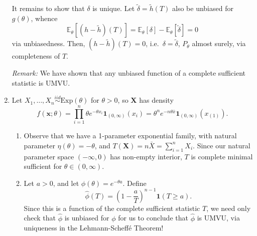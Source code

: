 \documentclass[11pt]{article}
\begin{document}
\begin{enumerate}
    It remains to show that $\delta$ is unique.
    Let $\tilde{\delta} = \tilde{h}(T)$ also be unbiased for $g(\theta)$,
    whence \[
        \mathbb{E}_\theta\left[(h - \tilde{h})(T)\right]
            = \mathbb{E}_\theta[\delta] - \mathbb{E}_\theta[\tilde{\delta}]
            = 0
    \] via unbiasedness.
    Then, $(h - \tilde{h})(T) = 0$, i.e.\ $\delta = \tilde{\delta}$,
    $P_\theta$ almost surely, via completeness of $T$.

    \emph{Remark:} We have shown that any unbiased function of a complete
    sufficient statistic is UMVU.



    \item Let $X_1, \dots, X_n \overset{iid}{\sim} \text{Exp}(\theta)$ for
    $\theta > 0$, so $\bm{X}$ has density \[
        f(\bm{x}; \theta)
            = \prod_{i = 1}^n \theta e^{-\theta x_i} \bm{1}_{(0, \infty)}(x_i)
            = \theta^n e^{-n\theta \bar{x}} \bm{1}_{(0, \infty)}(x_{(1)}).
    \]

    \begin{enumerate}
        \item Observe that we have a 1-parameter exponential family, with
        natural parameter $\eta(\theta) = -\theta$, and $T(\bm{X}) = n\bar{X}
        = \sum_{i = 1}^n X_i$.
        Since our natural parameter space $(-\infty, 0)$ has non-empty
        interior, $T$ is complete minimal sufficient for $\theta \in (0,
        \infty)$.


        \item Let $a > 0$, and let $\phi(\theta) = e^{-\theta a}$.
        Define \[
            \hat{\phi}(T) = \left(1 - \frac{a}{T}\right)^{n - 1} \bm{1}(T \geq a).
        \] Since this is a function of the complete sufficient statistic $T$,
        we need only check that $\hat{\phi}$ is unbiased for $\phi$ for us to
        conclude that $\hat{\phi}$ is UMVU, via uniqueness in the
        Lehmann-Scheff\'e Theorem!


\end{enumerate}
\end{enumerate}
\end{document}
